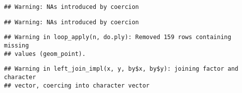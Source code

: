 \documentclass[10pt]{report}
\newenvironment{Shaded}{}{}
\newcommand{\KeywordTok}[1]{\textcolor[rgb]{0.00,0.44,0.13}{\textbf{{#1}}}}
\newcommand{\DataTypeTok}[1]{\textcolor[rgb]{0.56,0.13,0.00}{{#1}}}
\newcommand{\StringTok}[1]{\textcolor[rgb]{0.25,0.44,0.63}{{#1}}}
\newcommand{\CommentTok}[1]{\textcolor[rgb]{0.38,0.63,0.69}{\textit{{#1}}}}
\newcommand{\NormalTok}[1]{{#1}}
\begin{document}
\begin{verbatim}
## Warning: NAs introduced by coercion
\end{verbatim}

\begin{verbatim}
## Warning: NAs introduced by coercion
\end{verbatim}

\begin{verbatim}
## Warning in loop_apply(n, do.ply): Removed 159 rows containing missing
## values (geom_point).
\end{verbatim}

\begin{Shaded}
\end{Shaded}

\begin{verbatim}
## Warning in left_join_impl(x, y, by$x, by$y): joining factor and character
## vector, coercing into character vector
\end{verbatim}
\end{document}
